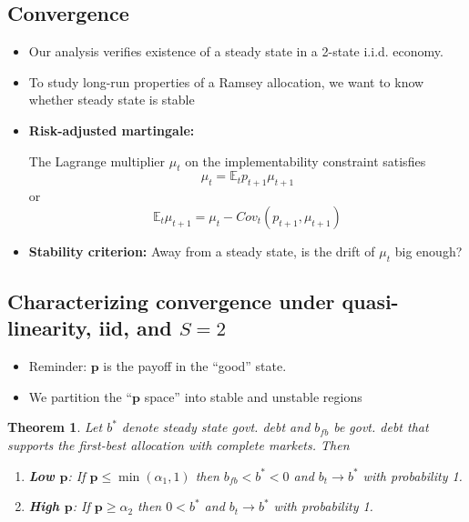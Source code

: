 \documentclass[12pt]{article}
\newcommand{\EE}{\mathbb E}
\newtheorem{theorem}{Theorem}[section]
\begin{document}
\subsection{Convergence}
  \begin{itemize}
		\item Our analysis verifies existence of a steady state in a 2-state i.i.d. economy.
		\item To study long-run properties of a Ramsey allocation, we want to know whether steady state is stable
		\item \textbf{Risk-adjusted martingale:}
		
		The Lagrange multiplier $\mu_t$ on the implementability  constraint   satisfies
		\[
			\mu_t = \EE_t p_{t+1} \mu_{t+1}
		\] or
		\[
		\EE_t  \mu_{t+1}	= \mu_t -Cov_t (p_{t+1}, \mu_{t+1})
		\]
	
		\item \textbf{Stability criterion: }   Away from a steady state, is the drift  of $\mu_t$ big enough?
		\end{itemize}
	
\subsection{Characterizing convergence under quasi-linearity, iid, and $S=2$}

  \begin{itemize}
  \item Reminder:  $\bm{p}$ is the payoff in the ``good'' state.
   \item We partition  the ``$\bm{p}$ space'' into stable and unstable regions
     \end{itemize}

 	\begin{theorem}
Let $b^*$ denote steady state govt.  debt and $b_{fb}$ be  govt.  debt that  supports the first-best allocation with complete markets.  Then %
		\begin{enumerate}
			\item  \textbf{Low $\bm{p}$}: If $\bm{p}\leq\min(\alpha_1,1)$ then  $b_{fb}<b^*<0$ and $b_t\rightarrow b^*$ with probability 1.
			\item \textbf{High  $\bm{p}$}:  If $\bm{p} \geq \alpha_2$ then   $0<b^*$ and $b_t \rightarrow b^*$ with probability 1.
			
			
			\end{enumerate}
			\end{theorem}
			
\end{document}
